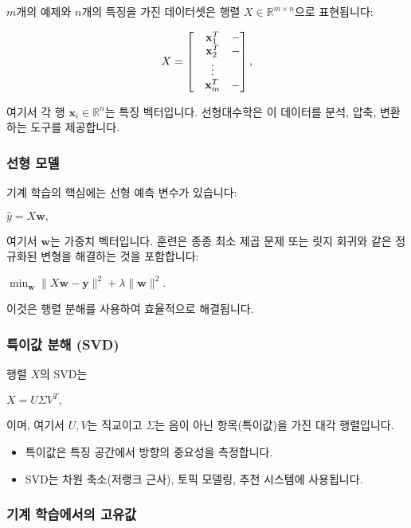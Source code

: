 \documentclass[
  12pt,
  a4paper,
]{article}
\begin{document}
\(m\)개의 예제와 \(n\)개의 특징을 가진 데이터셋은 행렬 \(X \in \mathbb{R}^{m \times n}\)으로 표현됩니다:

\[X =
\begin{bmatrix}
\- & \mathbf{x}_1^T & - \\
\- & \mathbf{x}_2^T & - \\
  & \vdots & \\
\- & \mathbf{x}_m^T & -
\end{bmatrix},\]

여기서 각 행 \(\mathbf{x}_i \in \mathbb{R}^n\)는 특징 벡터입니다. 선형대수학은 이 데이터를 분석, 압축, 변환하는 도구를 제공합니다.

\subsubsection{선형 모델}\label{linear-models}

기계 학습의 핵심에는 선형 예측 변수가 있습니다:

\(\hat{y} = X\mathbf{w},\)

여기서 \(\mathbf{w}\)는 가중치 벡터입니다. 훈련은 종종 최소 제곱 문제 또는 릿지 회귀와 같은 정규화된 변형을 해결하는 것을 포함합니다:

\(\min_{\mathbf{w}} \|X\mathbf{w} - \mathbf{y}\|^2 + \lambda \|\mathbf{w}\|^2.\)

이것은 행렬 분해를 사용하여 효율적으로 해결됩니다.

\subsubsection{특이값 분해 (SVD)}\label{singular-value-decomposition-svd}

행렬 \(X\)의 SVD는

\(X = U \Sigma V^T,\)

이며, 여기서 \(U, V\)는 직교이고 \(\Sigma\)는 음이 아닌 항목(특이값)을 가진 대각 행렬입니다.

\begin{itemize}
\item
  특이값은 특징 공간에서 방향의 중요성을 측정합니다.
\item
  SVD는 차원 축소(저랭크 근사), 토픽 모델링, 추천 시스템에 사용됩니다.
\end{itemize}

\subsubsection{기계 학습에서의 고유값}\label{eigenvalues-in-machine-learning}
\end{document}
